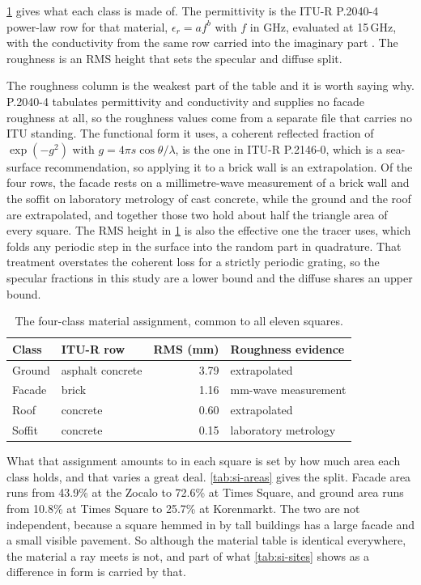 \documentclass[journal]{IEEEtran}
\begin{document}
\cref{tab:si-materials} gives what each class is made of. The permittivity is
the ITU-R P.2040-4 power-law row for that material, $\epsilon_r = a f^b$ with
$f$ in GHz, evaluated at 15\,GHz, with the conductivity from the same row
carried into the imaginary part \cite{itu2040}. The roughness is an RMS height
that sets the specular and diffuse split.

The roughness column is the weakest part of the table and it is worth saying
why. P.2040-4 tabulates permittivity and conductivity and supplies no facade
roughness at all, so the roughness values come from a separate file that carries
no ITU standing. The functional form it uses, a coherent reflected fraction of
$\exp(-g^2)$ with $g = 4\pi s \cos\theta / \lambda$, is the one in ITU-R
P.2146-0, which is a sea-surface recommendation, so applying it to a brick wall
is an extrapolation. Of the four rows, the facade rests on a millimetre-wave
measurement of a brick wall and the soffit on laboratory metrology of cast
concrete, while the ground and the roof are extrapolated, and together those two
hold about half the triangle area of every square. The RMS height in
\cref{tab:si-materials} is also the effective one the tracer uses, which folds
any periodic step in the surface into the random part in quadrature. That
treatment overstates the coherent loss for a strictly periodic grating, so the
specular fractions in this study are a lower bound and the diffuse shares an
upper bound.

\begin{table}[t]
  \centering
  \caption{The four-class material assignment, common to all eleven squares.}
  \label{tab:si-materials}
  \footnotesize
  \setlength{\tabcolsep}{4pt}
  \begin{tabular}{llrl}
    \toprule
    Class & ITU-R row & RMS (mm) & Roughness evidence \\
    \midrule
    Ground  & asphalt concrete & 3.79 & extrapolated \\
    Facade  & brick            & 1.16 & mm-wave measurement \\
    Roof    & concrete         & 0.60 & extrapolated \\
    Soffit  & concrete         & 0.15 & laboratory metrology \\
    \bottomrule
  \end{tabular}
\end{table}

What that assignment amounts to in each square is set by how much area each
class holds, and that varies a great deal. \cref{tab:si-areas} gives the split.
Facade area runs from 43.9\% at the Zocalo to 72.6\% at Times Square, and ground
area runs from 10.8\% at Times Square to 25.7\% at Korenmarkt. The two are not
independent, because a square hemmed in by tall buildings has a large facade and
a small visible pavement. So although the material table is identical
everywhere, the material a ray meets is not, and part of what
\cref{tab:si-sites} shows as a difference in form is carried by that.
\end{document}
